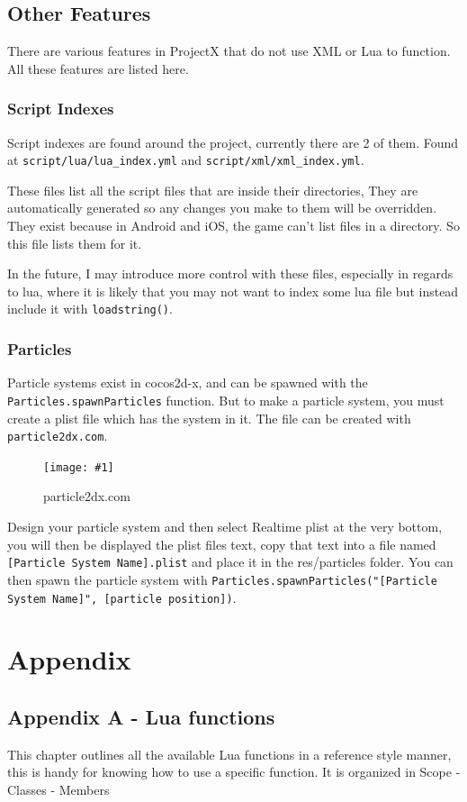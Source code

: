 \documentclass{book}
\newcommand{\hFigure}[2]
	{\begin{figure}[ht!]
		\centering
		\texttt{[image: \#1]}
		\caption{#2}
	\end{figure}}
\begin{document}
\chapter{Other Features}
There are various features in ProjectX that do not use XML or Lua to function. All these features are listed here.

\section{Script Indexes}
Script indexes are found around the project, currently there are 2 of them. Found at \texttt{script/lua/lua\_index.yml} and \texttt{script/xml/xml\_index.yml}.

These files list all the script files that are inside their directories, They are automatically generated so any changes you make to them will be overridden. They exist because in Android and iOS, the game can't list files in a directory. So this file lists them for it.

In the future, I may introduce more control with these files, especially in regards to lua, where it is likely that you may not want to index some lua file but instead include it with \texttt{loadstring()}.

\section{Particles}
Particle systems exist in cocos2d-x, and can be spawned with the \texttt{Particles.spawnParticles} function. But to make a particle system, you must create a plist file which has the system in it. The file can be created with \texttt{particle2dx.com}.

\hFigure{ParticleCreator.png}{particle2dx.com}

Design your particle system and then select Realtime plist at the very bottom, you will then be displayed the plist files text, copy that text into a file named \texttt{[Particle System Name].plist} and place it in the res/particles folder. You can then spawn the particle system with \texttt{Particles.spawnParticles("[Particle System Name]", [particle position])}.


\part{Appendix}
\chapter{Appendix A - Lua functions}
This chapter outlines all the available Lua functions in a reference style manner, this is handy for knowing how to use a specific function. It is organized in Scope - Classes - Members
\end{document}
